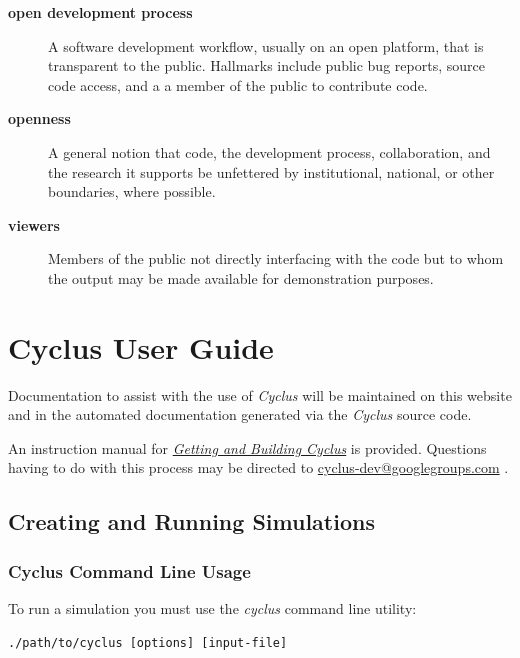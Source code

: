 \documentclass[letterpaper,10pt,english]{sphinxmanual}
\begin{document}
\begin{description}
\item[{\textbf{open development process}}] \leavevmode
A software development workflow, usually on an open platform, that is
transparent to the public. Hallmarks include public bug reports, source code
access, and a  a member of the public to contribute code.

\item[{\textbf{openness}}] \leavevmode
A general notion that code, the development process, collaboration, and the
research it supports be unfettered by institutional, national, or other
boundaries, where possible.

\item[{\textbf{viewers}}] \leavevmode
Members of the public not directly interfacing with the code but to
whom the output may be made available for demonstration purposes.

\end{description}


\section{Cyclus User Guide}
\label{usrdoc/main::doc}\label{usrdoc/main:cyclus-user-guide}
Documentation to assist with the use of \emph{Cyclus} will be maintained on this
website and in the automated documentation generated via the \emph{Cyclus} source
code.

An instruction manual for {\hyperref[devdoc/get_and_build::doc]{\emph{Getting and Building Cyclus}}} is provided.
Questions having to do with this process may be directed to
\href{mailto:cyclus-dev@googlegroups.com}{cyclus-dev@googlegroups.com} .


\subsection{Creating and Running Simulations}
\label{usrdoc/creating_and_running_sims:creating-and-running-simulations}\label{usrdoc/creating_and_running_sims::doc}

\subsubsection{Cyclus Command Line Usage}
\label{usrdoc/creating_and_running_sims:cyclus-command-line-usage}
To run a simulation you must use the \emph{cyclus} command line utility:

\begin{Verbatim}[commandchars=\\\{\}]
./path/to/cyclus [options] [input-file]
\end{Verbatim}
\end{document}
